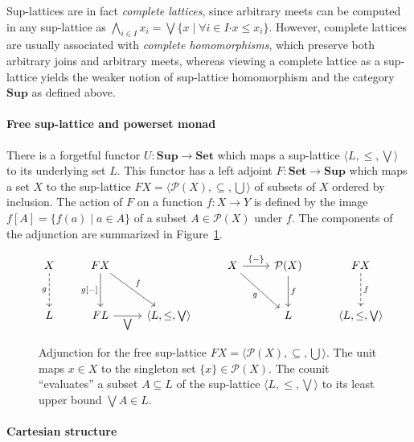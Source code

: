 \documentclass[11pt,oneside,draft]{book}
\theoremstyle{definition}
\newcommand{\bdot}{\boldsymbol{\cdot}}
\begin{document}
Sup-lattices are in fact \emph{complete lattices},
since arbitrary meets can be computed in any sup-lattice as
$
  \bigwedge_{i \in I} x_i =
  \bigvee \{ x \mid \forall i \in I \bdot x \le x_i \}
$.
However,
complete lattices are usually associated with
\emph{complete homomorphisms},
which preserve both arbitrary joins and arbitrary meets,
whereas viewing a complete lattice as a sup-lattice
yields the weaker notion of sup-lattice homomorphism
and the category $\mathbf{Sup}$ as defined above.

\paragraph{Free sup-lattice and powerset monad} %

There is a forgetful functor
$U : \mathbf{Sup} \rightarrow \mathbf{Set}$
which maps a sup-lattice $\langle L, {\le}, {\bigvee} \rangle$
to its underlying set $L$.
This functor has a left adjoint
$F : \mathbf{Set} \rightarrow \mathbf{Sup}$
which maps a set $X$ to the sup-lattice
$F X = \langle \mathcal{P}(X), {\subseteq}, {\bigcup} \rangle$
of subsets of $X$ ordered by inclusion.
The action of $F$ on a function $f : X \rightarrow Y$
is defined by the image $f[A] = \{ f(a) \mid a \in A \}$
of a subset $A \in \mathcal{P}(X)$ under $f$.
The components of the adjunction are summarized
in Figure~\ref{fig:pow}.


\begin{figure} %
  \[
    \begin{tikzcd}[row sep=large]
      X \ar[d, "g"', dashed] &
      F X \ar[d, "{g[-]}"'] \ar[dr, "f"] &
      &
      X \ar[r, "\{ - \}"] \ar[dr, "g"'] &
      \mathcal{P}(X) \ar[d, "f"] &
      F X \ar[d, "f", dashed]
      \\
      L &
      F L \ar[r, "{\bigvee}"'] &
      \langle L, {\le}, {\bigvee} \rangle &
      &
      L &
      \langle L, {\le}, {\bigvee} \rangle
    \end{tikzcd}
  \]
  \caption{Adjunction for the free sup-lattice
    $F X = \langle \mathcal{P}(X), {\subseteq}, {\bigcup} \rangle$.
    The unit maps $x \in X$
    to the singleton set $\{ x \} \in \mathcal{P}(X)$.
    The counit ``evaluates'' a subset $A \subseteq L$
    of the sup-lattice $\langle L, {\le}, {\bigvee} \rangle$
    to its least upper bound $\bigvee A \in L$.}
  \label{fig:pow}
\end{figure}

\paragraph{Cartesian structure} %
\end{document}
